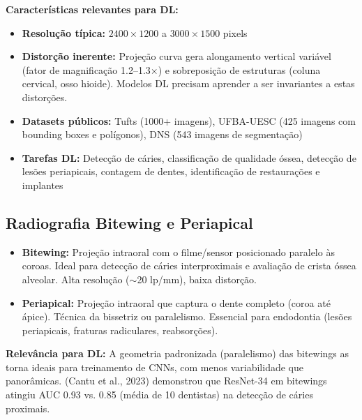 \textbf{Características relevantes para DL:}
\begin{itemize}
  \item \textbf{Resolução típica:} $2400 \times 1200$ a $3000 \times 1500$ pixels
  \item \textbf{Distorção inerente:} Projeção curva gera alongamento vertical
        variável (fator de magnificação 1.2--1.3$\times$) e sobreposição de
        estruturas (coluna cervical, osso hioide). Modelos DL precisam aprender
        a ser invariantes a estas distorções.
  \item \textbf{Datasets públicos:} Tufts (1000+ imagens), UFBA-UESC (425 imagens
        com bounding boxes e polígonos), DNS (543 imagens de segmentação)
  \item \textbf{Tarefas DL:} Detecção de cáries, classificação de qualidade óssea,
        detecção de lesões periapicais, contagem de dentes, identificação de
        restaurações e implantes
\end{itemize}


\subsection{Radiografia Bitewing e Periapical}

\begin{itemize}
  \item \textbf{Bitewing:} Projeção intraoral com o filme/sensor posicionado
        paralelo às coroas. Ideal para detecção de cáries interproximais e
        avaliação de crista óssea alveolar. Alta resolução ($\sim$20 lp/mm),
        baixa distorção.
  \item \textbf{Periapical:} Projeção intraoral que captura o dente completo
        (coroa até ápice). Técnica da bissetriz ou paralelismo. Essencial para
        endodontia (lesões periapicais, fraturas radiculares, reabsorções).
\end{itemize}

\textbf{Relevância para DL:} A geometria padronizada (paralelismo) das bitewings
as torna ideais para treinamento de CNNs, com menos variabilidade que panorâmicas.
 (Cantu et al., 2023) demonstrou que ResNet-34 em bitewings
atingiu AUC 0.93 vs. 0.85 (média de 10 dentistas) na detecção de cáries proximais.

